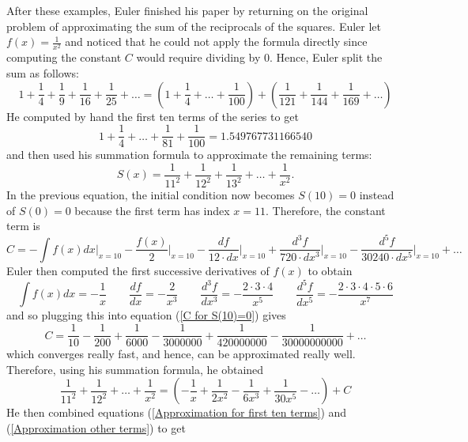 After these examples, Euler finished his paper by returning on the original problem of approximating the sum of the reciprocals of the squares. Euler let $f(x) = \frac{1}{x^2}$ and noticed that he could not apply the formula directly since computing the constant $C$ would require dividing by $0$. Hence, Euler split the sum as follows:
$$1 + \frac{1}{4} + \frac{1}{9} + \frac{1}{16} + \frac{1}{25} + \dots = \left(1 + \frac{1}{4} + \dots + \frac{1}{100}\right) + \left(\frac{1}{121} + \frac{1}{144} + \frac{1}{169} + \dots\right)$$
He computed by hand the first ten terms of the series to get
\begin{equation} \label{Approximation for first ten terms}
    1 + \frac{1}{4} + \dots + \frac{1}{81} + \frac{1}{100} = 1.549767731166540
\end{equation}
and then used his summation formula to approximate the remaining terms:
\begin{equation}
    S(x) = \frac{1}{11^2} + \frac{1}{12^2} + \frac{1}{13^2} + \dots + \frac{1}{x^2}.
\end{equation}
In the previous equation, the initial condition now becomes $S(10) = 0$ instead of $S(0) = 0$ because the first term has index $x = 11$. Therefore, the constant term is
\begin{equation} \label{C for S(10)=0}
    C = -\int f(x)dx\bigg\rvert_{x=10} - \frac{f(x)}{2}\bigg\rvert_{x=10} - \frac{df}{12\cdot dx}\bigg\rvert_{x=10} + \frac{d^3f}{720\cdot dx^3}\bigg\rvert_{x=10} - \frac{d^5f}{30240\cdot dx^5}\bigg\rvert_{x=10} + \dots
\end{equation}
Euler then computed the first successive derivatives of $f(x)$ to obtain
$$\int f(x)dx = -\frac{1}{x} \qquad  \frac{df}{dx} = -\frac{2}{x^3} \qquad \frac{d^3f}{dx^3} = -\frac{2\cdot 3 \cdot 4}{x^5} \qquad \frac{d^5f}{dx^5} = -\frac{2\cdot 3 \cdot 4 \cdot 5 \cdot 6}{x^7}$$
and so plugging this into equation (\ref{C for S(10)=0}) gives
$$C = \frac{1}{10} - \frac{1}{200} + \frac{1}{6000} - \frac{1}{3000000} + \frac{1}{420000000} - \frac{1}{30000000000} + \dots$$
which converges really fast, and hence, can be approximated really well. Therefore, using his summation formula, he obtained 
\begin{equation} \label{Approximation other terms}
    \frac{1}{11^2} + \frac{1}{12^2} + \dots + \frac{1}{x^2} = \left(-\frac{1}{x} + \frac{1}{2x^2} - \frac{1}{6x^3} + \frac{1}{30x^5} - \dots\right) + C
\end{equation}
He then combined equations (\ref{Approximation for first ten terms}) and (\ref{Approximation other terms}) to get
